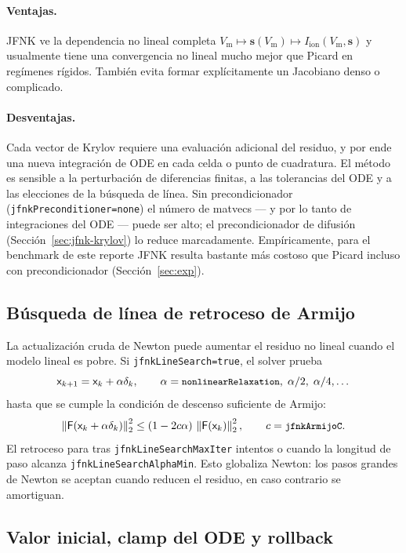 \documentclass[11pt,a4paper]{article}
\newcommand{\code}[1]{\texttt{\small #1}}
\newcommand{\Vm}{V_{\text{m}}}
\newcommand{\Iion}{I_{\mathrm{ion}}}
\newcommand{\Fres}{\mathsf{F}}
\newcommand{\norm}[1]{\left\lVert #1 \right\rVert}
\begin{document}
\paragraph{Ventajas.}
JFNK ve la dependencia no lineal completa
$\Vm\mapsto\mathbf{s}(\Vm)\mapsto\Iion(\Vm,\mathbf{s})$ y usualmente tiene una
convergencia no lineal mucho mejor que Picard en regímenes rígidos. También evita
formar explícitamente un Jacobiano denso o complicado.

\paragraph{Desventajas.}
Cada vector de Krylov requiere una evaluación adicional del residuo, y por ende una
nueva integración de ODE en cada celda o punto de cuadratura. El método es sensible
a la perturbación de diferencias finitas, a las tolerancias del ODE y a las
elecciones de la búsqueda de línea. Sin precondicionador
(\code{jfnkPreconditioner=none}) el número de matvecs --- y por lo tanto de
integraciones del ODE --- puede ser alto; el precondicionador de difusión
(Sección~\ref{sec:jfnk-krylov}) lo reduce marcadamente. Empíricamente, para el
benchmark de este reporte JFNK resulta bastante más costoso que Picard incluso con
precondicionador (Sección~\ref{sec:exp}).

\subsection{Búsqueda de línea de retroceso de Armijo}

La actualización cruda de Newton puede aumentar el residuo no lineal cuando el
modelo lineal es pobre. Si \code{jfnkLineSearch=true}, el solver prueba
\[
  \mathsf{x}_{k+1}=\mathsf{x}_{k}+\alpha\delta_{k},
  \qquad
  \alpha=\code{nonlinearRelaxation},\;
  \alpha/2,\;\alpha/4,\dots
\]
hasta que se cumple la condición de descenso suficiente de Armijo:
\begin{equation}
  \norm{\Fres(\mathsf{x}_{k}+\alpha\delta_{k})}_2^2
  \le
  (1-2c\alpha)\,\norm{\Fres(\mathsf{x}_{k})}_2^2,
  \qquad c=\code{jfnkArmijoC}.
  \label{eq:armijo}
\end{equation}
El retroceso para tras \code{jfnkLineSearchMaxIter} intentos o cuando la longitud de
paso alcanza \code{jfnkLineSearchAlphaMin}. Esto globaliza Newton: los pasos grandes
de Newton se aceptan cuando reducen el residuo, en caso contrario se amortiguan.

\subsection{Valor inicial, clamp del ODE y rollback}
\end{document}
